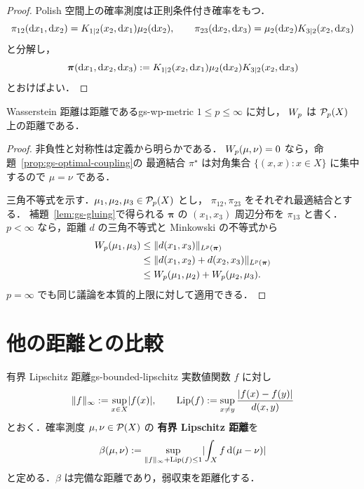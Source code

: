 \begin{proof}
  Polish 空間上の確率測度は正則条件付き確率をもつ．
  \[
    \pi_{12}(\mathrm{d} x_1,\mathrm{d} x_2)
    =K_{1|2}(x_2,\mathrm{d} x_1)\mu_2(\mathrm{d} x_2),
    \qquad
    \pi_{23}(\mathrm{d} x_2,\mathrm{d} x_3)
    =\mu_2(\mathrm{d} x_2)K_{3|2}(x_2,\mathrm{d} x_3)
  \]
  と分解し，
  \[
    \boldsymbol{\pi}(\mathrm{d} x_1,\mathrm{d} x_2,\mathrm{d} x_3)
    :=
    K_{1|2}(x_2,\mathrm{d} x_1)\mu_2(\mathrm{d} x_2)K_{3|2}(x_2,\mathrm{d} x_3)
  \]
  とおけばよい．
\end{proof}

\begin{proposition}{Wasserstein 距離は距離である}{gs-wp-metric}
  $1\leq p\leq\infty$ に対し，
  $W_p$ は $\mathcal{P}_{p}(X)$ 上の距離である．
\end{proposition}

\begin{proof}
  非負性と対称性は定義から明らかである．
  $W_p(\mu,\nu)=0$ なら，命題~\ref{prop:gs-optimal-coupling}の
  最適結合 $\pi^\star$ は対角集合
  $\{(x,x):x\in X\}$ に集中するので $\mu=\nu$ である．

  三角不等式を示す．$\mu_1,\mu_2,\mu_3\in\mathcal{P}_{p}(X)$ とし，
  $\pi_{12},\pi_{23}$ をそれぞれ最適結合とする．
  補題~\ref{lem:gs-gluing}で得られる $\boldsymbol{\pi}$ の
  $(x_1,x_3)$ 周辺分布を $\pi_{13}$ と書く．
  $p<\infty$ なら，距離 $d$ の三角不等式と Minkowski の不等式から
  \[
    \begin{aligned}
      W_p(\mu_1,\mu_3)
      &\leq
      \lVert d(x_1,x_3) \rVert_{L^p(\boldsymbol{\pi})} \\
      &\leq
      \lVert d(x_1,x_2)+d(x_2,x_3) \rVert_{L^p(\boldsymbol{\pi})} \\
      &\leq
      W_p(\mu_1,\mu_2)+W_p(\mu_2,\mu_3).
    \end{aligned}
  \]
  $p=\infty$ でも同じ議論を本質的上限に対して適用できる．
\end{proof}

\section{他の距離との比較}
\label{sec:metric-comparison}

\begin{definition}{有界 Lipschitz 距離}{gs-bounded-lipschitz}
  実数値関数 $f$ に対し
  \[
    \lVert f \rVert_\infty:=\sup_{x\in X}\lvert f(x) \rvert,
    \qquad
    \operatorname{Lip}(f):=\sup_{x\neq y}\frac{\lvert f(x)-f(y) \rvert}{d(x,y)}
  \]
  とおく．確率測度 $\mu,\nu\in\mathcal{P}(X)$ の
  \textbf{有界 Lipschitz 距離}を
  \[
    \beta(\mu,\nu)
    :=
    \sup_{\lVert f \rVert_\infty+\operatorname{Lip}(f)\leq1}
    \lvert \int_X f\,\mathrm{d}(\mu-\nu) \rvert
  \]
  と定める．$\beta$ は完備な距離であり，弱収束を距離化する．
\end{definition}

